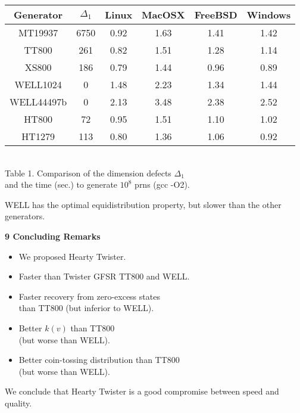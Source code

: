 \documentclass[a4j,12pt,landscape]{jarticle}
\begin{document}
\newpage
\begin{center}
\begin{tabular}{|c||c|c|c|c|c|}
\hline
{\Huge Generator}& {\Huge $\Delta_1$} 
  & {\Huge Linux} & {\Huge MacOSX} & {\Huge FreeBSD} & {\Huge Windows} \\ \hline \hline
{\Huge MT19937} & {\Huge 6750}
  & {\Huge 0.92} & {\Huge 1.63} & {\Huge 1.41} & {\Huge 1.42} \\ \hline
{\Huge TT800}  & {\Huge 261} 
  & {\Huge 0.82} & {\Huge 1.51} & {\Huge 1.28} & {\Huge 1.14} \\ \hline
{\Huge XS800} & {\Huge 186}
  & {\Huge 0.79} & {\Huge 1.44} & {\Huge 0.96} & {\Huge 0.89} \\ \hline
{\Huge WELL1024} & {\Huge 0}
  & {\Huge 1.48} & {\Huge 2.23} & {\Huge 1.34} & {\Huge 1.44} \\ \hline
{\Huge WELL44497b} & {\Huge 0}
  & {\Huge 2.13} & {\Huge 3.48} & {\Huge 2.38} & {\Huge 2.52} \\ \hline
{\Huge HT800} & {\Huge 72} 
  & {\Huge 0.95} & {\Huge 1.51} & {\Huge 1.10} & {\Huge 1.02} \\\hline
{\Huge HT1279} & {\Huge 113}
  & {\Huge 0.80} & {\Huge 1.36} & {\Huge 1.06} & {\Huge 0.92} \\ \hline
\end{tabular}
\\
\vskip 5mm
Table 1. Comparison of the dimension defects $\Delta_1$ 
\\
and the time (sec.) to generate $10^8$ prns (gcc -O2). 
\end{center}

WELL has the optimal equidistribution property, 
but slower than the other generators. 

\newpage
\noindent
{\bf 9 Concluding Remarks}
\begin{itemize}
\item We proposed Hearty Twister. 
\item Faster than Twister GFSR TT800 and WELL.
\item Faster recovery from zero-excess states \\
than TT800 (but inferior to WELL). 
\item Better $k(v)$ than TT800 \\
(but worse than WELL).
\item Better coin-tossing distribution than TT800 \\
(but worse than WELL).
\end{itemize}
We conclude that Hearty Twister is a good compromise
between speed and quality. 
\end{document}
